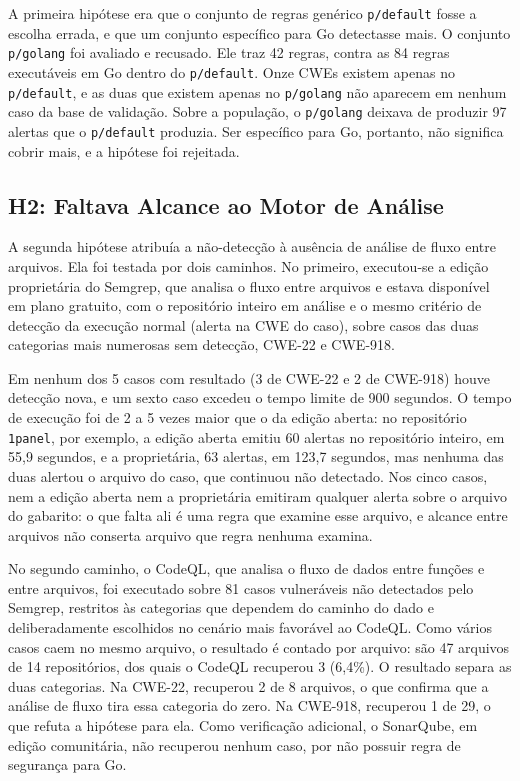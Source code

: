 A primeira hipótese era que o conjunto de regras genérico \texttt{p/default} fosse a escolha errada, e que um conjunto específico para Go detectasse mais. O conjunto \texttt{p/golang} foi avaliado e recusado. Ele traz 42 regras, contra as 84 regras executáveis em Go dentro do \texttt{p/default}. Onze CWEs existem apenas no \texttt{p/default}, e as duas que existem apenas no \texttt{p/golang} não aparecem em nenhum caso da base de validação. Sobre a população, o \texttt{p/golang} deixava de produzir 97 alertas que o \texttt{p/default} produzia. Ser específico para Go, portanto, não significa cobrir mais, e a hipótese foi rejeitada.

\subsection{H2: Faltava Alcance ao Motor de Análise}
\label{subsec:h2}

A segunda hipótese atribuía a não-detecção à ausência de análise de fluxo entre arquivos. Ela foi testada por dois caminhos. No primeiro, executou-se a edição proprietária do Semgrep, que analisa o fluxo entre arquivos e estava disponível em plano gratuito, com o repositório inteiro em análise e o mesmo critério de detecção da execução normal (alerta na CWE do caso), sobre casos das duas categorias mais numerosas sem detecção, CWE-22 e CWE-918.

Em nenhum dos 5 casos com resultado (3 de CWE-22 e 2 de CWE-918) houve detecção nova, e um sexto caso excedeu o tempo limite de 900 segundos. O tempo de execução foi de 2 a 5 vezes maior que o da edição aberta: no repositório \texttt{1panel}, por exemplo, a edição aberta emitiu 60 alertas no repositório inteiro, em 55,9 segundos, e a proprietária, 63 alertas, em 123,7 segundos, mas nenhuma das duas alertou o arquivo do caso, que continuou não detectado. Nos cinco casos, nem a edição aberta nem a proprietária emitiram qualquer alerta sobre o arquivo do gabarito: o que falta ali é uma regra que examine esse arquivo, e alcance entre arquivos não conserta arquivo que regra nenhuma examina.

No segundo caminho, o CodeQL, que analisa o fluxo de dados entre funções e entre arquivos, foi executado sobre 81 casos vulneráveis não detectados pelo Semgrep, restritos às categorias que dependem do caminho do dado e deliberadamente escolhidos no cenário mais favorável ao CodeQL. Como vários casos caem no mesmo arquivo, o resultado é contado por arquivo: são 47 arquivos de 14 repositórios, dos quais o CodeQL recuperou 3 (6,4\%). O resultado separa as duas categorias. Na CWE-22, recuperou 2 de 8 arquivos, o que confirma que a análise de fluxo tira essa categoria do zero. Na CWE-918, recuperou 1 de 29, o que refuta a hipótese para ela. Como verificação adicional, o SonarQube, em edição comunitária, não recuperou nenhum caso, por não possuir regra de segurança para Go.

